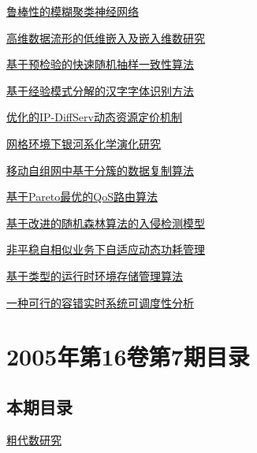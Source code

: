 \documentclass[a4paper]{article}
\begin{document}
\href{http://www.jos.org.cn/ch/reader/download_pdf.aspx?file_no=20050807&year_id=2005&quarter_id=8&falg=1}{鲁棒性的模糊聚类神经网络}

\href{http://www.jos.org.cn/ch/reader/download_pdf.aspx?file_no=20050808&year_id=2005&quarter_id=8&falg=1}{高维数据流形的低维嵌入及嵌入维数研究}

\href{http://www.jos.org.cn/ch/reader/download_pdf.aspx?file_no=20050809&year_id=2005&quarter_id=8&falg=1}{基于预检验的快速随机抽样一致性算法}

\href{http://www.jos.org.cn/ch/reader/download_pdf.aspx?file_no=20050810&year_id=2005&quarter_id=8&falg=1}{基于经验模式分解的汉字字体识别方法}

\href{http://www.jos.org.cn/ch/reader/download_pdf.aspx?file_no=20050812&year_id=2005&quarter_id=8&falg=1}{优化的IP-DiffServ动态资源定价机制}

\href{http://www.jos.org.cn/ch/reader/download_pdf.aspx?file_no=20050813&year_id=2005&quarter_id=8&falg=1}{网格环境下银河系化学演化研究}

\href{http://www.jos.org.cn/ch/reader/download_pdf.aspx?file_no=20050814&year_id=2005&quarter_id=8&falg=1}{移动自组网中基于分簇的数据复制算法}

\href{http://www.jos.org.cn/ch/reader/download_pdf.aspx?file_no=20050815&year_id=2005&quarter_id=8&falg=1}{基于Pareto最优的QoS路由算法}

\href{http://www.jos.org.cn/ch/reader/download_pdf.aspx?file_no=20050816&year_id=2005&quarter_id=8&falg=1}{基于改进的随机森林算法的入侵检测模型}

\href{http://www.jos.org.cn/ch/reader/download_pdf.aspx?file_no=20050817&year_id=2005&quarter_id=8&falg=1}{非平稳自相似业务下自适应动态功耗管理}

\href{http://www.jos.org.cn/ch/reader/download_pdf.aspx?file_no=20050818&year_id=2005&quarter_id=8&falg=1}{基于类型的运行时环境存储管理算法}

\href{http://www.jos.org.cn/ch/reader/download_pdf.aspx?file_no=20050819&year_id=2005&quarter_id=8&falg=1}{一种可行的容错实时系统可调度性分析}


\section{\textbf{2005年第16卷第7期目录}}
\subsection{本期目录}
\href{http://www.jos.org.cn/ch/reader/download_pdf.aspx?file_no=20050701&year_id=2005&quarter_id=7&falg=1}{粗代数研究}
\end{document}
